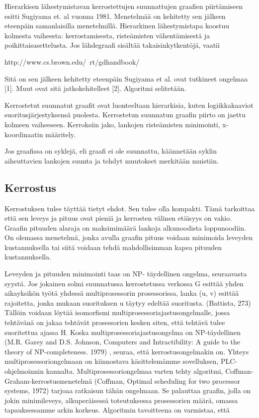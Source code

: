 \documentclass[finnish,12pt]{article}
\begin{document}
Hierarkisen lähestymistavan kerrostettujen suunnattujen graafien piirtämiseen esitti Sugiyama et. al vuonna 1981.
Menetelmää on kehitetty sen jälkeen eteenpäin samanlaisilla menetelmillä.
Hierarkinen lähestymistapa koostuu kolmesta vaiheesta: kerrostamisesta, risteämisten vähentämisestä ja poikittaisasettelusta.
Jos lähdegraafi sisältää takaisinkytkentöjä, vaatii

http://www.cs.brown.edu/~rt/gdhandbook/

Sitä on sen jälkeen kehitetty eteenpäin 
Sugiyama et al. ovat tutkineet ongelmaa [1]. Muut ovat sitä jatkokehitelleet [2]. Algoritmi selitetään.

Kerrostetut suunnatut graafit ovat luonteeltaan hierarkisia, kuten logiikkakaaviot suoritusjärjestyksensä puolesta.
Kerrostetun suunnatun graafin piirto on jaettu kolmeen vaiheeseen. Kerroksiin jako, lankojen risteämisten minimointi, x-koordinaatin määritely.

Jos graafissa on syklejä, eli graafi ei ole suunnattu, käännetään syklin aiheuttavien lankojen suunta ja tehdyt muutokset merkitään muistiin.

		\subsection{Kerrostus}

Kerrostuksen tulee täyttää tietyt ehdot.
Sen tulee olla kompakti.
Tämä tarkoittaa että sen leveys ja pituus ovat pieniä ja kerrosten välinen etäisyys on vakio.
Graafin pituuden alaraja on maksimimäärä lankoja alkunoodista loppunoodiin.
On olemassa menetelmä, jonka avulla graafin pituus voidaan minimoida leveyden kustannuksella tai siitä voidaan tehdä mahdollisimman kapea pituuden kustannuksella.

Leveyden ja pituuden minimointi taas on NP- täydellinen ongelma, seuraavasta syystä.
Jos jokainen solmi suunnatussa kerrostetussa verkossa G esittää yhden aikayksikön työtä yhdessä multiprosessorin prosessorissa, lanka (u, v) esittää rajoitetta, jonka mukaan suorituksen u täytyy edeltää suoritusta. (Battista, 273)
Tällöin voidaan löytää isomorfismi multiprosessoriajastusongelmalle, jossa tehtävänä on jakaa tehtävät prosessorien kesken siten, että tehtävä tulee suoritettua ajassa H.
Koska multiprosessoriajastusongelma on NP-täydellinen (M.R. Garey and D.S. Johnson, Computers and Intractibility: A guide to the theory of NP-completeness. 1979) , seuraa, että kerrostusongelmakin on.
Yhteys multiprosessoriongelmaan on kiinnostava käsittelemämme sovelluksen, PLC-ohjelmoinnin kannalta.
Multiprosessoriongelmaa varten tehty algoritmi, Coffman-Graham-kerrostusmenetelmä (Coffman, Optimal scheduling for two processor systems, 1972) tarjoaa ratkaisun tähän ongelmaan.
Se palauttaa graafin, jolla on jokin minimileveys, alkuperäisessä toteutuksessa prosessorien määrä, omassa tapauksessamme arkin korkeus. 
Algoritmin tavoitteena on varmistaa, että 
\end{document}
